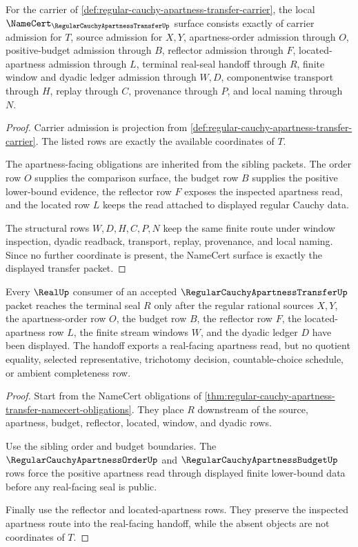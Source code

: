 \begin{theorem}
\label{thm:regular-cauchy-apartness-transfer-namecert-obligations}
For the carrier of \autoref{def:regular-cauchy-apartness-transfer-carrier}, the local $\NameCert_{\RegularCauchyApartnessTransferUp}$ surface consists exactly of carrier admission for $T$, source admission for $X,Y$, apartness-order admission through $O$, positive-budget admission through $B$, reflector admission through $F$, located-apartness admission through $L$, terminal real-seal handoff through $R$, finite window and dyadic ledger admission through $W,D$, componentwise transport through $H$, replay through $C$, provenance through $P$, and local naming through $N$.
\end{theorem}
\begin{proof}
Carrier admission is projection from \autoref{def:regular-cauchy-apartness-transfer-carrier}. The listed rows are exactly the available coordinates of $T$.

The apartness-facing obligations are inherited from the sibling packets. The order row $O$ supplies the comparison surface, the budget row $B$ supplies the positive lower-bound evidence, the reflector row $F$ exposes the inspected apartness read, and the located row $L$ keeps the read attached to displayed regular Cauchy data.

The structural rows $W,D,H,C,P,N$ keep the same finite route under window inspection, dyadic readback, transport, replay, provenance, and local naming. Since no further coordinate is present, the NameCert surface is exactly the displayed transfer packet.
\end{proof}

\begin{theorem}
\label{thm:regular-cauchy-apartness-transfer-real-seal-handoff}
Every $\RealUp$ consumer of an accepted $\RegularCauchyApartnessTransferUp$ packet reaches the terminal seal $R$ only after the regular rational sources $X,Y$, the apartness-order row $O$, the budget row $B$, the reflector row $F$, the located-apartness row $L$, the finite stream windows $W$, and the dyadic ledger $D$ have been displayed. The handoff exports a real-facing apartness read, but no quotient equality, selected representative, trichotomy decision, countable-choice schedule, or ambient completeness row.
\end{theorem}
\begin{proof}
Start from the NameCert obligations of \autoref{thm:regular-cauchy-apartness-transfer-namecert-obligations}. They place $R$ downstream of the source, apartness, budget, reflector, located, window, and dyadic rows.

Use the sibling order and budget boundaries. The $\RegularCauchyApartnessOrderUp$ and $\RegularCauchyApartnessBudgetUp$ rows force the positive apartness read through displayed finite lower-bound data before any real-facing seal is public.

Finally use the reflector and located-apartness rows. They preserve the inspected apartness route into the real-facing handoff, while the absent objects are not coordinates of $T$.
\end{proof}

